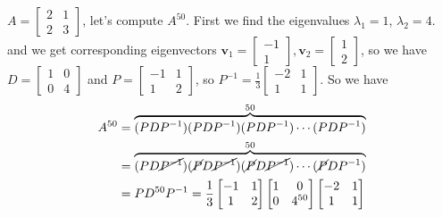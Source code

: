 \documentclass{beamer}
\theoremstyle{definition}
\theoremstyle{remark}
\begin{document}
\begin{frame}[t]
\begin{example}
$A=\begin{bmatrix}
2&1\\
2&3
\end{bmatrix}$, let's compute $A^{50}$\pause. First we find the eigenvalues $\lambda_1=1$, $\lambda_2=4$. and we get corresponding eigenvectors $\mathbf v_1=\begin{bmatrix}
-1\\1
\end{bmatrix},\mathbf v_2=\begin{bmatrix}
1\\2
\end{bmatrix}$, so we have $D=\begin{bmatrix}
1&0\\0&4
\end{bmatrix}$ and $P=\begin{bmatrix}
-1&1\\1&2
\end{bmatrix}$, so $P^{-1}=\frac{1}{3}\begin{bmatrix}
-2&1\\1&1
\end{bmatrix}$\pause. So we have
\begin{align*}
A^{50} &= \overbrace{(PDP^{-1})(PDP^{-1})(PDP^{-1})\cdots(PDP^{-1})}^{50}\\
&=\overbrace{(PD\cancel{P^{-1}})(\cancel PD\cancel{P^{-1}})(\cancel PD\cancel{P^{-1}})\cdots(\cancel PDP^{-1})}^{50}\\
&=PD^{50}P^{-1}=\frac{1}{3}\begin{bmatrix}
-1&1\\1&2
\end{bmatrix}\begin{bmatrix}
1&0\\0&4^{50}
\end{bmatrix}\begin{bmatrix}
-2&1\\1&1
\end{bmatrix}
\end{align*}
\end{example}
\end{frame}


\end{document}
